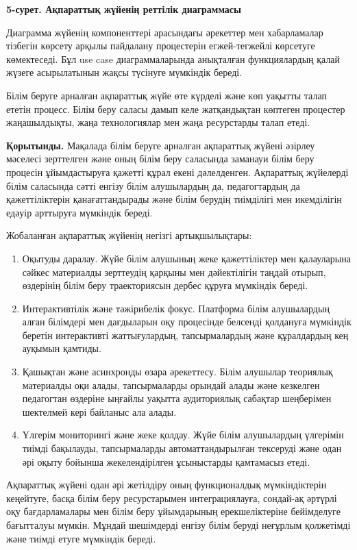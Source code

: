 {\bfseries 5-сурет. Ақпараттық жүйенің реттілік диаграммасы}

Диаграмма жүйенің компоненттері арасындағы әрекеттер мен хабарламалар
тізбегін көрсету арқылы пайдалану процестерін егжей-тегжейлі көрсетуге
көмектеседі. Бұл use case диаграммаларында анықталған функциялардың
қалай жүзеге асырылатынын жақсы түсінуге мүмкіндік береді.

Білім беруге арналған ақпараттық жүйе өте күрделі және көп уақытты талап
ететін процесс. Білім беру саласы дамып келе жатқандықтан көптеген
процестер жаңашылдықты, жаңа технологиялар мен жаңа ресурстарды талап
етеді.

{\bfseries Қорытынды.} Мақалада білім беруге арналған ақпараттық жүйені
әзірлеу мәселесі зерттелген және оның білім беру саласында заманауи
білім беру процесін ұйымдастыруға қажетті құрал екені дәлелденген.
Ақпараттық жүйелерді білім саласында сәтті енгізу білім алушылардың да,
педагогтардың да қажеттіліктерін қанағаттандырады және білім берудің
тиімділігі мен икемділігін едәуір арттыруға мүмкіндік береді.

Жобаланған ақпараттық жүйенің негізгі артықшылықтары:

\begin{enumerate}
\def\labelenumi{\arabic{enumi}.}
\item
  Оқытуды даралау. Жүйе білім алушының жеке қажеттіліктер мен
  қалауларына сәйкес материалды зерттеудің қарқыны мен дәйектілігін
  таңдай отырып, өздерінің білім беру траекториясын дербес құруға
  мүмкіндік береді.
\item
  Интерактивтілік және тәжірибелік фокус. Платформа білім алушылардың
  алған білімдері мен дағдыларын оқу процесінде белсенді қолдануға
  мүмкіндік беретін интерактивті жаттығулардың, тапсырмалардың және
  құралдардың кең ауқымын қамтиды.
\item
  Қашықтан және асинхронды өзара әрекеттесу. Білім алушылар теориялық
  материалды оқи алады, тапсырмаларды орындай алады және кезкелген
  педагогтан өздеріне ыңғайлы уақытта аудиториялық сабақтар шеңберімен
  шектелмей кері байланыс ала алады.
\item
  Үлгерім мониторингі және жеке қолдау. Жүйе білім алушылардың үлгерімін
  тиімді бақылауды, тапсырмаларды автоматтандырылған тексеруді және одан
  әрі оқыту бойынша жекелендірілген ұсыныстарды қамтамасыз етеді.
\end{enumerate}

Ақпараттық жүйені одан әрі жетілдіру оның функционалдық мүмкіндіктерін
кеңейтуге, басқа білім беру ресурстарымен интеграциялауға, сондай-ақ
әртүрлі оқу бағдарламалары мен білім беру ұйымдарының ерекшеліктеріне
бейімделуге бағытталуы мүмкін. Мұндай шешімдерді енгізу білім беруді
неғұрлым қолжетімді және тиімді етуге мүмкіндік береді.

